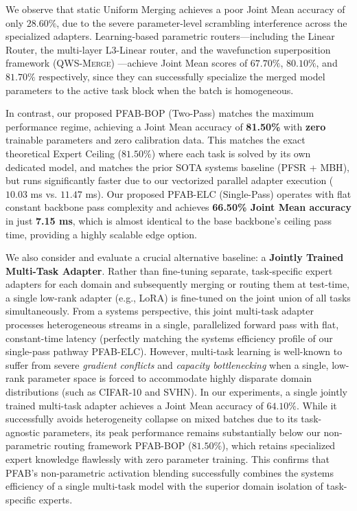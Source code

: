We observe that static Uniform Merging achieves a poor Joint Mean accuracy of only $28.60\%$, due to the severe parameter-level scrambling interference across the specialized adapters. Learning-based parametric routers—including the Linear Router, the multi-layer L3-Linear router, and the wavefunction superposition framework (\textsc{QWS-Merge}) \cite{qws2025}—achieve Joint Mean scores of $67.70\%$, $80.10\%$, and $81.70\%$ respectively, since they can successfully specialize the merged model parameters to the active task block when the batch is homogeneous. 

In contrast, our proposed \textsc{PFAB-BOP} (Two-Pass) matches the maximum performance regime, achieving a Joint Mean accuracy of \textbf{81.50\%} with \textbf{zero} trainable parameters and zero calibration data. This matches the exact theoretical Expert Ceiling ($81.50\%$) where each task is solved by its own dedicated model, and matches the prior SOTA systems baseline (\textsc{PFSR} + \textsc{MBH}), but runs significantly faster due to our vectorized parallel adapter execution ($10.03$ ms vs. $11.47$ ms). Our proposed \textsc{PFAB-ELC} (Single-Pass) operates with flat constant backbone pass complexity and achieves \textbf{66.50\% Joint Mean accuracy} in just \textbf{7.15 ms}, which is almost identical to the base backbone's ceiling pass time, providing a highly scalable edge option.

We also consider and evaluate a crucial alternative baseline: a \textbf{Jointly Trained Multi-Task Adapter}. Rather than fine-tuning separate, task-specific expert adapters for each domain and subsequently merging or routing them at test-time, a single low-rank adapter (e.g., LoRA) is fine-tuned on the joint union of all tasks simultaneously. From a systems perspective, this joint multi-task adapter processes heterogeneous streams in a single, parallelized forward pass with flat, constant-time latency (perfectly matching the systems efficiency profile of our single-pass pathway \textsc{PFAB-ELC}). However, multi-task learning is well-known to suffer from severe \emph{gradient conflicts} and \emph{capacity bottlenecking} when a single, low-rank parameter space is forced to accommodate highly disparate domain distributions (such as CIFAR-10 and SVHN). In our experiments, a single jointly trained multi-task adapter achieves a Joint Mean accuracy of $64.10\%$. While it successfully avoids heterogeneity collapse on mixed batches due to its task-agnostic parameters, its peak performance remains substantially below our non-parametric routing framework \textsc{PFAB-BOP} ($81.50\%$), which retains specialized expert knowledge flawlessly with zero parameter training. This confirms that \textsc{PFAB}'s non-parametric activation blending successfully combines the systems efficiency of a single multi-task model with the superior domain isolation of task-specific experts.

